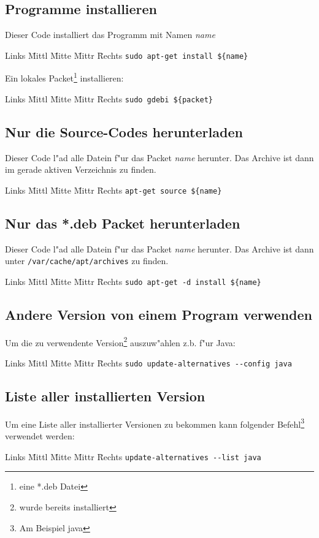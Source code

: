 \documentclass[12pt]{article}
\newenvironment{code}{\begin{tabbing}Links \= Mittl \= Mitte \= Mittr \= Rechts \kill}{\end{tabbing}}
\begin{document}
\subsection{Programme installieren}
Dieser Code installiert das Programm mit Namen \textit{name}
\begin{code}
	\> \verb#sudo apt-get install ${name}#
\end{code}
Ein lokales Packet\footnote{eine *.deb Datei} installieren:
\begin{code}
	\> \verb#sudo gdebi ${packet}#
\end{code}

\subsection{Nur die Source-Codes herunterladen}
Dieser Code l"ad alle Datein f"ur das Packet \textit{name} herunter. Das Archive ist dann 
im gerade aktiven Verzeichnis zu finden.
\begin{code}
	\> \verb#apt-get source ${name}#
\end{code}

\subsection{Nur das *.deb Packet herunterladen}
Dieser Code l"ad alle Datein f"ur das Packet \textit{name} herunter. Das Archive ist dann unter 
\verb#/var/cache/apt/archives# zu finden.
\begin{code}
	\> \verb#sudo apt-get -d install ${name}#
\end{code}
\subsection{Andere Version von einem Program verwenden}
Um die zu verwendente Version\footnote{wurde bereits installiert} auszuw"ahlen
z.b. f"ur Java:
\begin{code}
	\> \verb#sudo update-alternatives --config java#
\end{code}
\subsection{Liste aller installierten Version}
Um eine Liste aller installierter Versionen zu bekommen kann folgender Befehl\footnote{Am Beispiel java}
 verwendet werden:
\begin{code}
	\> \verb#update-alternatives --list java#
\end{code}
\end{document}
